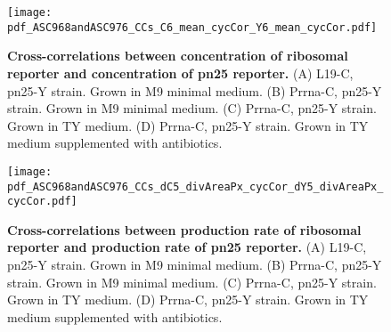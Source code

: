 \begin{figure}
    \centering
    \texttt{[image: pdf\_ASC968andASC976\_CCs\_C6\_mean\_cycCor\_Y6\_mean\_cycCor.pdf]}
    \caption{ 
        \textbf{Cross-correlations between concentration of ribosomal reporter and concentration of pn25 reporter.}
        (A) L19-C, pn25-Y strain. Grown in M9 minimal medium.
        (B) Prrna-C, pn25-Y strain. Grown in M9 minimal medium.
        (C) Prrna-C, pn25-Y strain. Grown in TY medium.
        (D) Prrna-C, pn25-Y strain. Grown in TY medium supplemented with antibiotics.
    }
    \label{fig:ribo:CCsEERiboPn25}
\end{figure}

\begin{figure}
    \centering
    \texttt{[image: pdf\_ASC968andASC976\_CCs\_dC5\_divAreaPx\_cycCor\_dY5\_divAreaPx\_cycCor.pdf]}
    \caption{ 
        \textbf{Cross-correlations between production rate of ribosomal reporter and production rate of pn25 reporter.}
        (A) L19-C, pn25-Y strain. Grown in M9 minimal medium.
        (B) Prrna-C, pn25-Y strain. Grown in M9 minimal medium.
        (C) Prrna-C, pn25-Y strain. Grown in TY medium.
        (D) Prrna-C, pn25-Y strain. Grown in TY medium supplemented with antibiotics.
    }
    \label{fig:ribo:CCsPPRiboPn25}
\end{figure}




